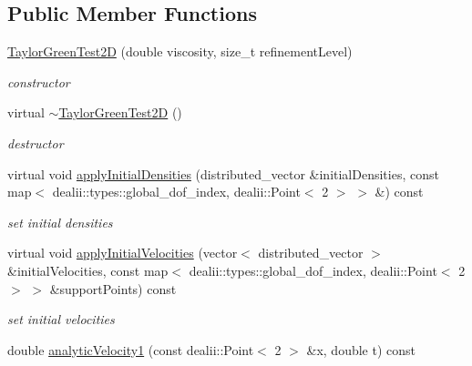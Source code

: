 \subsection*{Public Member Functions}
\begin{DoxyCompactItemize}
\item 
\hyperlink{classTaylorGreenTest2D_a891500a30b0fae0784496f9c219bd31b}{TaylorGreenTest2D} (double viscosity, size\_\-t refinementLevel)
\begin{DoxyCompactList}\small\item\em constructor \item\end{DoxyCompactList}\item 
\hypertarget{classTaylorGreenTest2D_a393d90458a3415572c3d9bebccdcb662}{
virtual \hyperlink{classTaylorGreenTest2D_a393d90458a3415572c3d9bebccdcb662}{$\sim$TaylorGreenTest2D} ()}
\label{classTaylorGreenTest2D_a393d90458a3415572c3d9bebccdcb662}

\begin{DoxyCompactList}\small\item\em destructor \item\end{DoxyCompactList}\item 
virtual void \hyperlink{classTaylorGreenTest2D_afb1eb7785fdf13833f322312e5552c4d}{applyInitialDensities} (distributed\_\-vector \&initialDensities, const map$<$ dealii::types::global\_\-dof\_\-index, dealii::Point$<$ 2 $>$ $>$ \&) const 
\begin{DoxyCompactList}\small\item\em set initial densities \item\end{DoxyCompactList}\item 
virtual void \hyperlink{classTaylorGreenTest2D_a24c05ac74d000754f0caf03653bdf793}{applyInitialVelocities} (vector$<$ distributed\_\-vector $>$ \&initialVelocities, const map$<$ dealii::types::global\_\-dof\_\-index, dealii::Point$<$ 2 $>$ $>$ \&supportPoints) const 
\begin{DoxyCompactList}\small\item\em set initial velocities \item\end{DoxyCompactList}\item 
\hypertarget{classTaylorGreenTest2D_a2ae2c4a4ec55242c69a7c9cd60e8bc01}{
double \hyperlink{classTaylorGreenTest2D_a2ae2c4a4ec55242c69a7c9cd60e8bc01}{analyticVelocity1} (const dealii::Point$<$ 2 $>$ \&x, double t) const }
\label{classTaylorGreenTest2D_a2ae2c4a4ec55242c69a7c9cd60e8bc01}


\end{DoxyCompactItemize}
